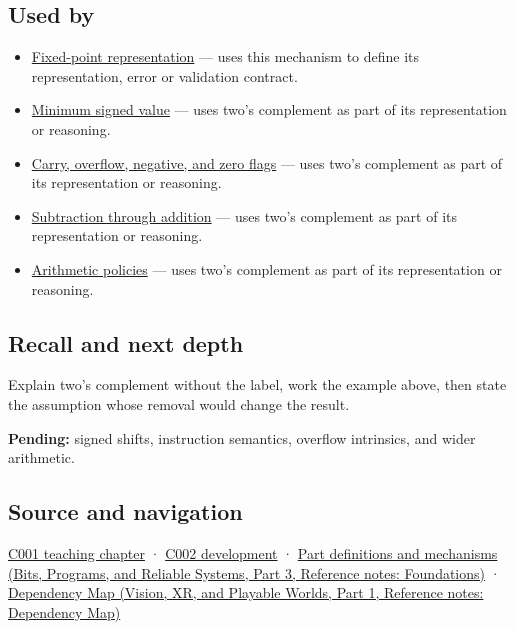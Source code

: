 \subsection{Used by}\label{appendix-4fbc03d20829-used-by}

\hypertarget{appendix-4fbc03d20829-used-by}{}

\begin{itemize}
\item
  \hyperref[appendix-1d0dbe8924cc]{Fixed-point representation} --- uses this mechanism to define its representation, error or validation contract.
\item
  \hyperref[appendix-05f39b10364d]{Minimum signed value} --- uses two's complement as part of its representation or reasoning.
\item
  \hyperref[appendix-8d687c9c08ab]{Carry, overflow, negative, and zero flags} --- uses two's complement as part of its representation or reasoning.
\item
  \hyperref[appendix-1c7df340573e]{Subtraction through addition} --- uses two's complement as part of its representation or reasoning.
\item
  \hyperref[appendix-2ed044358b82]{Arithmetic policies} --- uses two's complement as part of its representation or reasoning.
\end{itemize}

\subsection{Recall and next depth}\label{appendix-4fbc03d20829-recall-and-next-depth}

\hypertarget{appendix-4fbc03d20829-recall-and-next-depth}{}

Explain two's complement without the label, work the example above, then state the assumption whose removal would change the result.

\textbf{Pending:} signed shifts, instruction semantics, overflow intrinsics, and wider arithmetic.

\subsection{Source and navigation}\label{appendix-4fbc03d20829-source-and-navigation}

\hypertarget{appendix-4fbc03d20829-source-and-navigation}{}

\hyperref[01-foundations-i-ch001-from-a-signal-to-an-interpretation]{C001 teaching chapter} · \hyperref[01-foundations-i-ch001-arithmetic-becomes-a-policy]{C002 development} · \href{../01-Bits-Programs-and-Reliable-Systems-P03/main.pdf\#nameddest=appendix-fd090d982a15}{Part definitions and mechanisms (Bits, Programs, and Reliable Systems, Part 3, Reference notes: Foundations)} · \href{../07-Vision-XR-and-Playable-Worlds-P01/main.pdf\#nameddest=appendix-4ad47bdd269a}{Dependency Map (Vision, XR, and Playable Worlds, Part 1, Reference notes: Dependency Map)}
